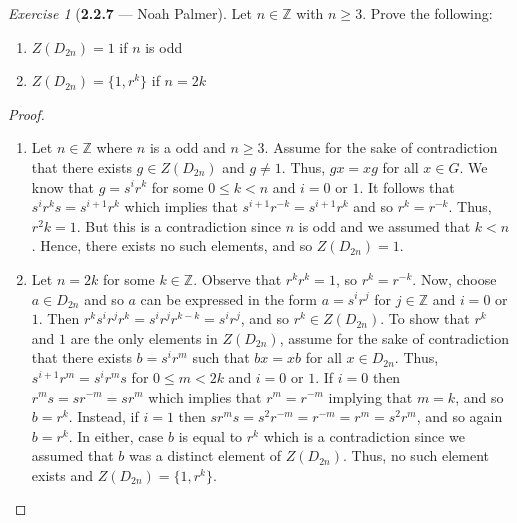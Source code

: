 \documentclass[12pt]{amsart}
\theoremstyle{remark}
\newtheorem*{exercise}{Exercise}%
\theoremstyle{mycomment}
\begin{document}
\begin{exercise}[\textbf{2.2.7} --- Noah Palmer] Let $n\in\mathbb{Z}$ with $n\ge 3$. Prove the following:
  \begin{enumerate}
  \item[(a)] $Z(D_{2n})=1$ if $n$ is odd
  \item[(b)] $Z(D_{2n})=\{1,r^k\}$ if $n=2k$
  \end{enumerate}
  \begin{proof}
  \begin{enumerate}
  \item[(a)] Let $n\in\mathbb{Z}$ where $n$ is a odd and $n\ge 3$. Assume for the sake of contradiction that there exists $g\in Z(D_{2n})$ and $g\neq 1$. Thus, $gx=xg$ for all $x\in G$. We know that $g=s^ir^k$ for some $0\leq k<n$ and $i=0$ or $1$. It follows that $s^ir^ks=s^{i+1}r^k$ which implies that $s^{i+1}r^{-k}=s^{i+1}r^k$ and so $r^k=r^{-k}$. Thus, $r^2k=1$. But this is a contradiction since $n$ is odd and we assumed that $k<n$. Hence, there exists no such elements, and so $Z(D_{2n})=1$.

  \item[(b)] Let $n=2k$ for some $k\in\mathbb{Z}$. Observe that $r^kr^k=1$, so $r^k=r^{-k}$. Now, choose $a\in D_{2n}$ and so $a$ can be expressed in the form $a=s^ir^j$ for $j\in\mathbb{Z}$ and $i=0$ or $1$. Then $r^ks^ir^jr^k=s^ir^{j}r^{k-k}=s^ir^j$, and so $r^k\in Z(D_{2n})$. To show that $r^k$ and $1$ are the only elements in $Z(D_{2n})$, assume for the sake of contradiction that there exists $b=s^ir^m$ such that $bx=xb$ for all $x\in D_{2n}$. Thus, $s^{i+1}r^m=s^ir^ms$ for $0\leq m<2k$ and $i=0$ or $1$. If $i=0$ then $r^ms=sr^{-m}=sr^m$ which implies that $r^m=r^{-m}$ implying that $m=k$, and so $b=r^k$. Instead, if $i=1$ then $sr^ms=s^2r^{-m}=r^{-m}=r^m=s^2r^m$, and so again $b=r^k$. In either, case $b$ is equal to $r^k$ which is a contradiction since we assumed that $b$ was a distinct element of $Z(D_{2n})$. Thus, no such element exists and $Z(D_{2n})=\{1,r^k\}$.
  \end{enumerate}
  \end{proof}
  \end{exercise}
\vspace{.15in}
\end{document}
